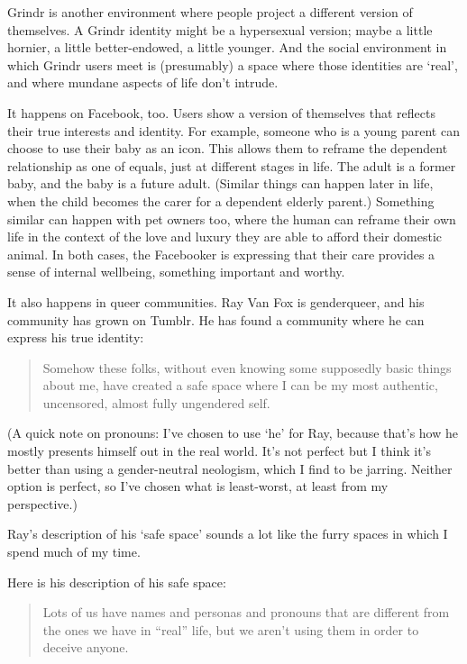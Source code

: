 Grindr is another environment where people project a different version of themselves. A Grindr identity might be a hypersexual version; maybe a little hornier, a little better-endowed, a little younger. And the social environment in which Grindr users meet is (presumably) a space where those identities are `real', and where mundane aspects of life don't intrude.

It happens on Facebook, too. Users show a version of themselves that reflects their true interests and identity. For example, someone who is a young parent can choose to use their baby as an icon. This allows them to reframe the dependent relationship as one of equals, just at different stages in life. The adult is a former baby, and the baby is a future adult. (Similar things can happen later in life, when the child becomes the carer for a dependent elderly parent.) Something similar can happen with pet owners too, where the human can reframe their own life in the context of the love and luxury they are able to afford their domestic animal. In both cases, the Facebooker is expressing that their care provides a sense of internal wellbeing, something important and worthy.

It also happens in queer communities. Ray Van Fox is genderqueer, and his community has grown on Tumblr. He has found a community where he can express his true identity:

\begin{quote}
  Somehow these folks, without even knowing some supposedly basic things about me, have created a safe space where I can be my most authentic, uncensored, almost fully ungendered self.
\end{quote}

(A quick note on pronouns: I've chosen to use `he' for Ray, because that's how he mostly presents himself out in the real world. It's not perfect but I think it's better than using a gender-neutral neologism, which I find to be jarring. Neither option is perfect, so I've chosen what is least-worst, at least from my perspective.)

Ray's description of his `safe space' sounds a lot like the furry spaces in which I spend much of my time.

Here is his description of his safe space:

\begin{quote}
  Lots of us have names and personas and pronouns that are different from the ones we have in ``real'' life, but we aren't using them in order to deceive anyone.
\end{quote}

